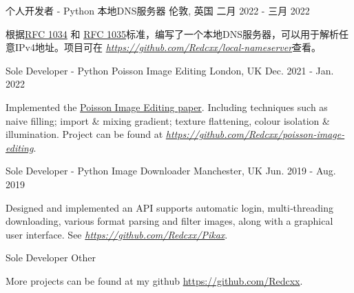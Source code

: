 \begin{cventries}
  \cventry
    {个人开发者 - Python} %
    {本地DNS服务器} %
    {伦敦, 英国} %
    {二月 2022 - 三月 2022} %
    {
      \begin{cvitems} %
        \item {根据\href{https://datatracker.ietf.org/doc/html/rfc1034}{RFC 1034} 和 \href{https://datatracker.ietf.org/doc/html/rfc1035}{RFC 1035}标准，编写了一个本地DNS服务器，可以用于解析任意IPv4地址。项目可在 \href{https://github.com/Redcxx/local-nameserver}{\textit{https://github.com/Redcxx/local-nameserver}}查看。}
      \end{cvitems}
    }
    
  \cventry
    {Sole Developer - Python} %
    {Poisson Image Editing} %
    {London, UK} %
    {Dec. 2021 - Jan. 2022} %
    {
      \begin{cvitems} %
        \item {Implemented the \href{https://www.cs.jhu.edu/~misha/Fall07/Papers/Perez03.pdf}{Poisson Image Editing paper}. Including techniques such as naive filling; import \& mixing gradient; texture flattening, colour isolation \& illumination.  Project can be found at \href{https://github.com/Redcxx/poisson-image-editing}{\textit{https://github.com/Redcxx/poisson-image-editing}}.}
      \end{cvitems}
    }

  \cventry
    {Sole Developer - Python} %
    {Image Downloader} %
    {Manchester, UK} %
    {Jun. 2019 - Aug. 2019} %
    {
      \begin{cvitems} %
        \item {Designed and implemented an API supports automatic login, multi‑threading downloading, various format parsing and filter images, along with a graphical user interface. See \href{https://github.com/Redcxx/Pikax}{\textit{https://github.com/Redcxx/Pikax}}.}
      \end{cvitems}
    }
    
  \cventry
    {Sole Developer} %
    {Other} %
    {} %
    {} %
    {
      \begin{cvitems} %
        \item {More projects can be found at my github \href{https://github.com/Redcxx}{https://github.com/Redcxx}.}
      \end{cvitems}
    }
  
    


\end{cventries}
